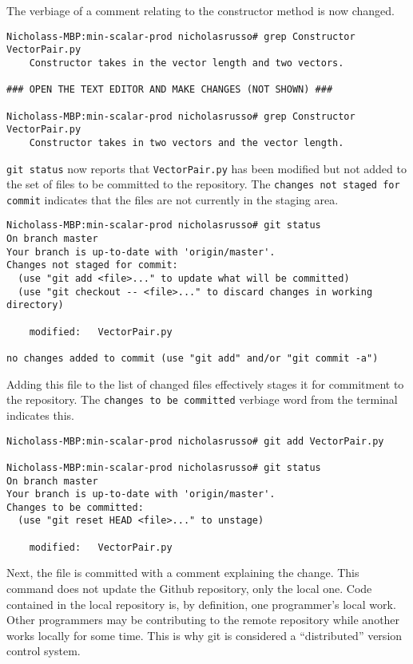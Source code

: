 The verbiage of a comment relating to the constructor method is now changed.

\begin{verbatim}
Nicholass-MBP:min-scalar-prod nicholasrusso# grep Constructor VectorPair.py
    Constructor takes in the vector length and two vectors.

### OPEN THE TEXT EDITOR AND MAKE CHANGES (NOT SHOWN) ###

Nicholass-MBP:min-scalar-prod nicholasrusso# grep Constructor VectorPair.py
    Constructor takes in two vectors and the vector length.
\end{verbatim}

\verb|git status| now reports that \verb|VectorPair.py| has been modified but
not added to the set of files to be committed to the repository.
The \verb|changes not staged for commit| indicates that the files are
not currently in the staging area.

\begin{verbatim}
Nicholass-MBP:min-scalar-prod nicholasrusso# git status
On branch master
Your branch is up-to-date with 'origin/master'.
Changes not staged for commit:
  (use "git add <file>..." to update what will be committed)
  (use "git checkout -- <file>..." to discard changes in working directory)

	modified:   VectorPair.py

no changes added to commit (use "git add" and/or "git commit -a")
\end{verbatim}

Adding this file to the list of changed files effectively stages it for
commitment to the repository. The \verb|changes to be committed| verbiage
word from the terminal indicates this.

\begin{verbatim}
Nicholass-MBP:min-scalar-prod nicholasrusso# git add VectorPair.py

Nicholass-MBP:min-scalar-prod nicholasrusso# git status
On branch master
Your branch is up-to-date with 'origin/master'.
Changes to be committed:
  (use "git reset HEAD <file>..." to unstage)

	modified:   VectorPair.py
\end{verbatim}

Next, the file is committed with a comment explaining the change. This command
does not update the Github repository, only the local one. Code contained in
the local repository is, by definition, one programmer's local work. Other
programmers may be contributing to the remote repository while another works
locally for some time. This is why git is considered a ``distributed'' version
control system.

